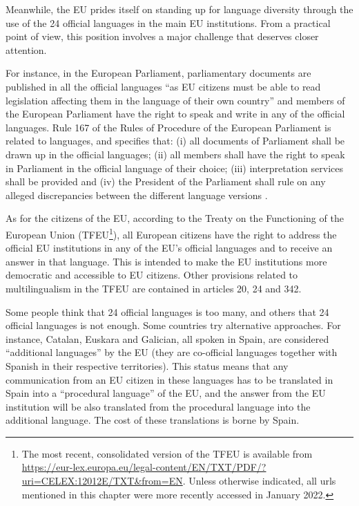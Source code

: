 \documentclass[output=paper]{langscibook}
\begin{document}
Meanwhile, the EU prides itself on standing up for language diversity through the use of the 24 official languages in the main EU institutions. From a practical point of view, this position involves a major challenge that deserves closer attention.\largerpage



For instance, in the European Parliament, parliamentary documents are published in all the official languages “as EU citizens must be able to read legislation affecting them in the language of their own country” \citep{EuropeanParliament2020} and members of the European Parliament have the right to speak and write in any of the official languages. Rule 167 of the Rules of Procedure of the European Parliament is related to languages, and specifies that: (i) all documents of Parliament shall be drawn up in the official languages; (ii) all members shall have the right to speak in Parliament in the official language of their choice; (iii) interpretation services shall be provided and (iv) the President of the Parliament shall rule on any alleged discrepancies between the different language versions \citep{EuropeanParliament2021}.



As for the citizens of the EU, according to the Treaty on the Functioning of the European Union (TFEU\footnote{The most recent, consolidated version of the TFEU is available from \url{https://eur-lex.europa.eu/legal-content/EN/TXT/PDF/?uri=CELEX:12012E/TXT\&from=EN}. Unless otherwise indicated, all urls mentioned in this chapter were more recently accessed in January 2022.}), all European citizens have the right to address the official EU institutions in any of the EU’s official languages and to receive an answer in that language. This is intended to make the EU institutions more democratic and accessible to EU citizens. Other provisions related to multilingualism in the TFEU are contained in articles 20, 24 and 342.


Some people think that 24 official languages is too many, and others that 24 official languages is not enough. Some countries try alternative approaches. For instance, Catalan, Euskara and Galician, all spoken in Spain, are considered “additional languages” by the EU  (they are co-official languages together with Spanish in their respective territories). This status means that any communication from an EU citizen in these languages has to be translated in Spain into a “procedural language” of the EU, and the answer from the EU institution will be also translated from the procedural language into the additional language. The cost of these translations is borne by Spain. 
\end{document}
